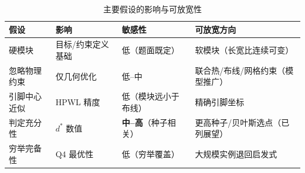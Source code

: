 \documentclass[12pt,a4paper]{article}
\begin{document}
\begin{table}[H]
\centering
\scriptsize
\setlength{\tabcolsep}{3pt}
\caption{主要假设的影响与可放宽性}
\begin{tabular}{llll}
\toprule
假设 & 影响 & 敏感性 & 可放宽方向 \\
\midrule
硬模块 & 目标/约束定义基础 & 低（题面既定） & 软模块（长宽比连续可变） \\
忽略物理约束 & 仅几何优化 & 低--中 & 联合热/布线/网格约束（模型推广） \\
引脚中心近似 & HPWL 精度 & 低（模块远小于布线） & 精确引脚坐标 \\
判定充分性 & $d^*$ 数值 & \textbf{中--高}（种子相关） & 更高种子/贝叶斯选点（已列展望） \\
穷举完备性 & Q4 最优性 & 低（穷举覆盖） & 大规模实例退回启发式 \\
\bottomrule
\end{tabular}
\end{table}
\end{document}
